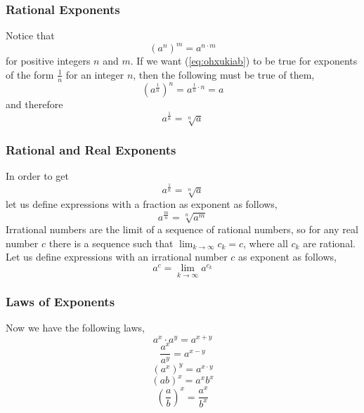 \documentclass[xcolor=dvipsnames]{beamer}
\begin{document}
\begin{frame}
  \frametitle{Rational Exponents}
Notice that
\begin{equation}
  \label{eq:ohxukiab}
  \left(a^{n}\right)^{m}=a^{n\cdot{}m}
\end{equation}
for positive integers $n$ and $m$. If we want (\ref{eq:ohxukiab}) to
be true for exponents of the form $\frac{1}{n}$ for an integer $n$,
then the following must be true of them,
\begin{equation}
  \label{eq:aivienai}
  \left(a^{\frac{1}{n}}\right)^{n}=a^{\frac{1}{n}\cdot{}n}=a
\end{equation}
and therefore
\begin{equation}
  \label{eq:kaohahae}
  a^{\frac{1}{n}}=\sqrt[n]{a}
\end{equation}
\end{frame}

\begin{frame}
  \frametitle{Rational and Real Exponents}
In order to get
\begin{equation}
  \label{eq:yahdahse}
  a^{\frac{1}{n}}=\sqrt[n]{a}
\end{equation}
let us define expressions with a fraction as exponent as follows,
\begin{equation}
  \label{eq:aiweelef}
  a^{\frac{m}{n}}=\sqrt[n]{a^{m}}
\end{equation}
Irrational numbers are the limit of a sequence of rational numbers, so
for any real number $c$ there is a sequence such that
$\lim_{k\rightarrow{}\infty}c_{k}=c$, where all $c_{k}$ are rational.
Let us define expressions with an irrational number $c$ as exponent as
follows,
\begin{equation}
  \label{eq:iefiemae}
  a^{c}=\lim_{k\rightarrow{}\infty}a^{c_{k}}
\end{equation}
\end{frame}

\begin{frame}
  \frametitle{Laws of Exponents}
Now we have the following laws,
\begin{equation}
  \label{eq:eihietae}
  a^{x}\cdot{}a^{y}=a^{x+y}
\end{equation}
\begin{equation}
  \label{eq:eeyaidie}
  \frac{a^{x}}{a^{y}}=a^{x-y}
\end{equation}
\begin{equation}
  \label{eq:ieboonge}
  \left(a^{x}\right)^{y}=a^{x\cdot{}y}
\end{equation}
\begin{equation}
  \label{eq:oongenoh}
  (ab)^{x}=a^{x}b^{x}
\end{equation}
\begin{equation}
  \label{eq:rahsieti}
  \left(\frac{a}{b}\right)^{x}=\frac{a^{x}}{b^{x}}
\end{equation}
\end{frame}
\end{document}
